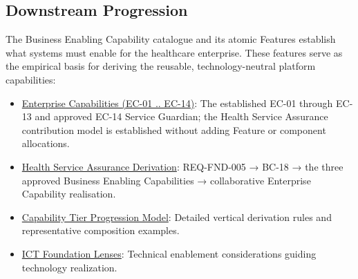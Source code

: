 \label{rad:enabling:775}

\par\smallskip
{}\label{rad:enabling:777}
\subsection*{Downstream Progression}
\label{rad:enabling:779}

The Business Enabling Capability catalogue and its atomic Features establish what systems must enable for the healthcare enterprise. These features serve as the empirical basis for deriving the reusable, technology-neutral platform capabilities:

\label{rad:enabling:780}

\begin{itemize}

\item 
\hyperref[rad:enterprise]{Enterprise Capabilities (EC-01 .. EC-14)}: The established EC-01 through EC-13 and approved EC-14 Service Guardian; the Health Service Assurance contribution model is established without adding Feature or component allocations.



\item 
\hyperref[rad:assurance-strategy]{Health Service Assurance Derivation}: REQ-FND-005 → BC-18 → the three approved Business Enabling Capabilities → collaborative Enterprise Capability realisation.



\item 
\hyperref[rad:tier-model]{Capability Tier Progression Model}: Detailed vertical derivation rules and representative composition examples.



\item 
\href{https://github.com/fhirfactory/harmonia/blob/98410db60155198a75f74c79d98060070209faa1/docs/markdown/02-strategy/capabilities/ict-foundation-lenses.md}{ICT Foundation Lenses}: Technical enablement considerations guiding technology realization.



\end{itemize}
